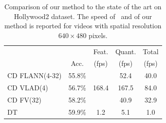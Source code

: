 \documentclass[10pt,twocolumn,letterpaper]{article}
\begin{document}

\begin{table}
\begin{center}
\begin{tabular}{|l|c|c|c|c|}
\hline
		 				&  	 		& Feat.                   	& Quant. 		& Total		\\
		 				& Acc.  	& (fps)								& (fps)			& (fps)		\\\hline
CD FLANN(4-32)	& 55.8\%	& \multirow{3}{*}{168.4} 	& 52.4    	& 40.0 	\\ %
CD VLAD(4) 		& 56.7\%	&										& 167.5	& 84.0	\\ %
CD FV(32)			& 58.2\%	&										& 40.9 	& 32.9	\\ %
\hline
DT \cite{Wang12}& 59.9\%		& 1.2									& 5.1 		&	1.0	\\\hline %
\end{tabular}
\mbox{}\\
\caption{Comparison of our method to the state of the art on Hollywood2 dataset. The speed of~\cite{Wang12} and of our method is reported for videos with spatial resolution $640\times 480$ pixels.\vspace{-.3cm}}
\label{tab:hwd2_comparison}
\end{center}
\end{table}
\end{document}
